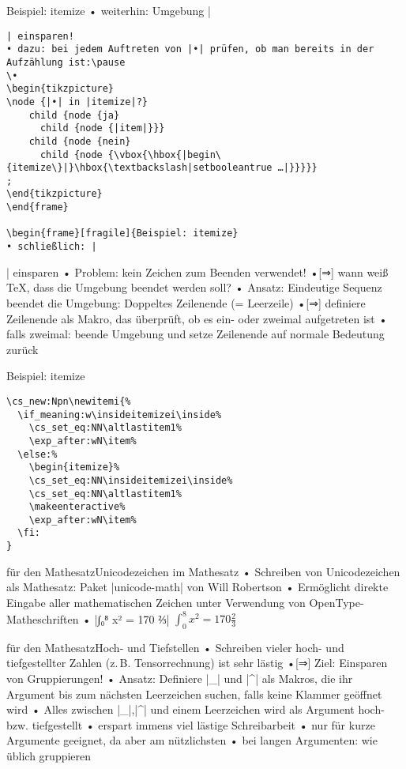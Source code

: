 \documentclass[t]{beamer}
\begin{document}
\begin{frame}[fragile]{Beispiel: itemize}
• weiterhin: Umgebung |\begin{verbatim}| einsparen!
• dazu: bei jedem Auftreten von |•| prüfen, ob man bereits in der Aufzählung ist:\pause
\•
\begin{tikzpicture}
\node {|•| in |itemize|?}
    child {node {ja}
      child {node {|item|}}}
    child {node {nein}
      child {node {\vbox{\hbox{|begin\{itemize\}|}\hbox{\textbackslash|setbooleantrue …|}}}}}
;
\end{tikzpicture}
\end{frame}

\begin{frame}[fragile]{Beispiel: itemize}
• schließlich: |\end{verbatim}| einsparen
• Problem: kein Zeichen zum Beenden verwendet!
•[⇒] wann weiß \TeX, dass die Umgebung beendet werden soll?\pause
• Ansatz: Eindeutige Sequenz beendet die Umgebung: Doppeltes Zeilenende (= Leerzeile)
•[⇒] definiere Zeilenende als Makro, das überprüft, ob es ein- oder zweimal aufgetreten ist
• falls zweimal: beende Umgebung und setze Zeilenende auf normale Bedeutung zurück
\•
\end{frame}

\begin{frame}[fragile]{Beispiel: itemize}
\begin{verbatim}
\cs_new:Npn\newitemi{%
  \if_meaning:w\insideitemizei\inside%
    \cs_set_eq:NN\altlastitem1%
    \exp_after:wN\item%
  \else:%
    \begin{itemize}%
    \cs_set_eq:NN\insideitemizei\inside%
    \cs_set_eq:NN\altlastitem1%
    \makeenteractive%
    \exp_after:wN\item%
  \fi:
}
\end{verbatim}
\end{frame}

\begin{frame}[fragile]{\altTeX für den Mathesatz}{Unicodezeichen im Mathesatz}
• Schreiben von Unicodezeichen als Mathesatz: Paket |unicode-math| von Will Robertson\pause
• Ermöglicht direkte Eingabe aller mathematischen Zeichen unter Verwendung von OpenType-Matheschriften
• |∫₀⁸ x² = 170 ⅔| $\int _0^8 x^2 = 170 \frac23$
\•
\end{frame}

\begin{frame}[fragile]{\altTeX für den Mathesatz}{Hoch- und Tiefstellen}
• Schreiben vieler hoch- und tiefgestellter Zahlen (z.\,B. Tensorrechnung) ist sehr lästig
•[⇒] Ziel: Einsparen von Gruppierungen!
• Ansatz: Definiere |_| und |^| als Makros, die ihr Argument bis zum nächsten Leerzeichen suchen, falls keine Klammer geöffnet wird
• Alles zwischen |_|,|^| und einem Leerzeichen wird als Argument hoch- bzw. tiefgestellt
• erspart immens viel lästige Schreibarbeit
• nur für kurze Argumente geeignet, da aber am nützlichsten
• bei langen Argumenten: wie üblich gruppieren
\•
\end{frame}
\end{document}
